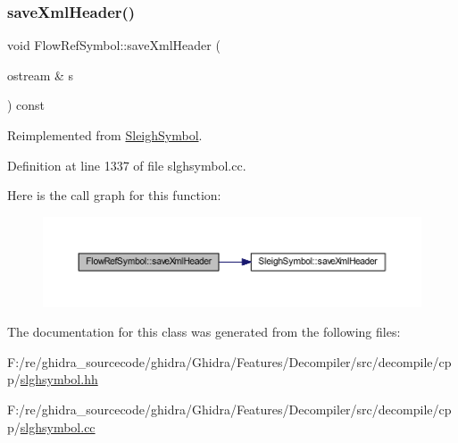 \subsubsection{\texorpdfstring{saveXmlHeader()}{saveXmlHeader()}}
{\footnotesize\ttfamily void Flow\+Ref\+Symbol\+::save\+Xml\+Header (\begin{DoxyParamCaption}\item[{ostream \&}]{s }\end{DoxyParamCaption}) const\hspace{0.3cm}{\ttfamily [virtual]}}



Reimplemented from \mbox{\hyperlink{class_sleigh_symbol_ac501be7c584bc0568c29fb95910962e9}{Sleigh\+Symbol}}.



Definition at line 1337 of file slghsymbol.\+cc.

Here is the call graph for this function\+:
\nopagebreak
\begin{figure}[H]
\begin{center}
\leavevmode
\includegraphics[width=350pt]{class_flow_ref_symbol_aa98cb037aedede53c7306aa43cb7310b_cgraph}
\end{center}
\end{figure}


The documentation for this class was generated from the following files\+:\begin{DoxyCompactItemize}
\item 
F\+:/re/ghidra\+\_\+sourcecode/ghidra/\+Ghidra/\+Features/\+Decompiler/src/decompile/cpp/\mbox{\hyperlink{slghsymbol_8hh}{slghsymbol.\+hh}}\item 
F\+:/re/ghidra\+\_\+sourcecode/ghidra/\+Ghidra/\+Features/\+Decompiler/src/decompile/cpp/\mbox{\hyperlink{slghsymbol_8cc}{slghsymbol.\+cc}}\end{DoxyCompactItemize}

